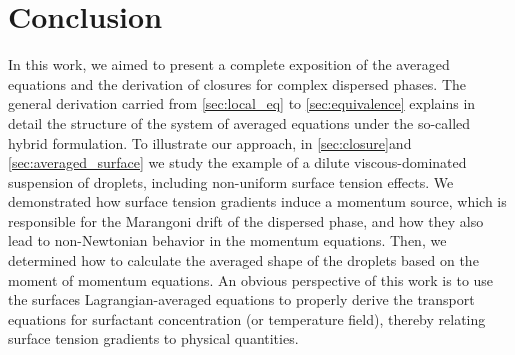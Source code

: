 \section{Conclusion}
\label{sec:conclusion}




In this work, we aimed to present a complete exposition of the averaged equations and the derivation of closures for complex dispersed phases. 
The general derivation carried from \ref{sec:local_eq} to \ref{sec:equivalence} explains in detail the structure of the system of averaged equations under the so-called hybrid formulation.  
To illustrate our approach, in \ref{sec:closure}and \ref{sec:averaged_surface} we study the example of a dilute viscous-dominated suspension of droplets, including non-uniform surface tension effects. 
We demonstrated how surface tension gradients induce a momentum source, which is responsible for the Marangoni drift of the dispersed phase, and how they also lead to non-Newtonian behavior in the momentum equations. 
Then, we determined how to calculate the averaged shape of the droplets based on the moment of momentum equations. 
An obvious perspective of this work is to use the surfaces Lagrangian-averaged equations to properly derive the transport equations for surfactant concentration (or temperature field), thereby relating surface tension gradients to physical quantities.  


